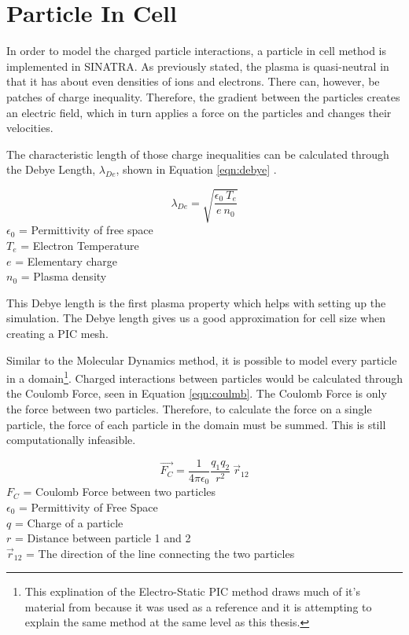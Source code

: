 
\section{Particle In Cell}

In order to model the charged particle interactions, a particle in cell method is implemented in SINATRA. As previously stated, the plasma is quasi-neutral in that it has about even densities of ions and electrons. There can, however, be patches of charge inequality. Therefore, the gradient between the particles creates an electric field, which in turn applies a force on the particles and changes their velocities. \par


The characteristic length of those charge inequalities can be calculated through the Debye Length, \(\lambda_{De}\), shown in Equation \ref{eqn:debye} \cite{debye}. \par


\begin{equation}
    \label{eqn:debye}
    \lambda_{De} = \sqrt{\frac{\epsilon_0 \: T_e}{e \: n_0}}
\end{equation}
\(\epsilon_0\) = Permittivity of free space \\
\(T_e\) = Electron Temperature \\
\(e\) = Elementary charge \\
\(n_0\) = Plasma density \par

\indent This Debye length is the first plasma property which helps with setting up the simulation. The Debye length gives us a good approximation for cell size when creating a PIC mesh. \par 

\indent Similar to the Molecular Dynamics method, it is possible to model every particle in a domain\footnote{This explination of the Electro-Static PIC method draws much of it's material from \cite{es-pic} because it was used as a reference and it is attempting to explain the same method at the same level as this thesis.}. Charged interactions between particles would be calculated through the Coulomb Force, seen in Equation \ref{eqn:coulmb}. The Coulomb Force is only the force between two particles. Therefore, to calculate the force on a single particle, the force of each particle in the domain must be summed. This is still computationally infeasible. \par 

\begin{equation}
    \label{eqn:coulmb}
    \vec{F_C} = \frac{1}{4 \pi \epsilon_0} \frac{q_1 q_2}{r^2}  \: \vec{r}_{12}
\end{equation}
\(F_C\) = Coulomb Force between two particles \\
\(\epsilon_0\) = Permittivity of Free Space \\
\(q\) = Charge of a particle \\
\(r\) = Distance between particle 1 and 2 \\
\(\vec{r}_{12}\) = The direction of the line connecting the two particles \par

